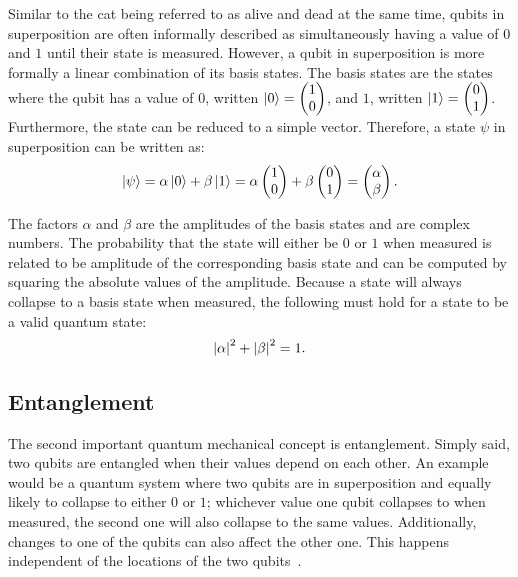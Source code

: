 Similar to the cat being referred to as alive and dead at the same time, qubits in superposition are often informally described as simultaneously having a value of $0$ and $1$ until their state is measured. However, a qubit in superposition is more formally a linear combination of its basis states. The basis states are the states where the qubit has a value of $0$, written $\ket{0} = \begin{pmatrix} 1 \\ 0 \end{pmatrix}$, and $1$, written $\ket{1} = \begin{pmatrix} 0 \\ 1 \end{pmatrix}$. Furthermore, the state can be reduced to a simple vector. Therefore, a state $\psi$ in superposition can be written as:
\begin{equation*}
    \ket{\psi} = \alpha \ket{0} + \beta \ket{1} = \alpha \begin{pmatrix} 1 \\ 0 \end{pmatrix} + \beta \begin{pmatrix} 0 \\ 1 \end{pmatrix} = \begin{pmatrix} \alpha \\ \beta \end{pmatrix}.
\end{equation*}

The factors $\alpha$ and $\beta$ are the amplitudes of the basis states and are complex numbers. The probability that the state will either be $0$ or $1$ when measured is related to be amplitude of the corresponding basis state and can be computed by squaring the absolute values of the amplitude. Because a state will always collapse to a basis state when measured, the following must hold for a state to be a valid quantum state:
\begin{equation*}
    \abs{\alpha}^2 + \abs{\beta}^2 = 1.
\end{equation*}

\subsection{Entanglement}
The second important quantum mechanical concept is entanglement. Simply said, two qubits are entangled when their values depend on each other. An example would be a quantum system where two qubits are in superposition and equally likely to collapse to either $0$ or $1$; whichever value one qubit collapses to when measured, the second one will also collapse to the same values.
 Additionally, changes to one of the qubits can also affect the other one. This happens independent of the locations of the two qubits~\cite{RDB*22, HHHH09}. 

